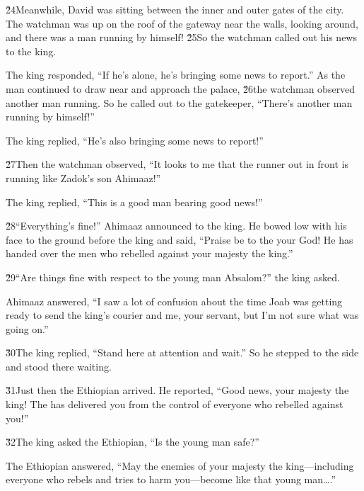 \v{24}Meanwhile, David was sitting between the inner and outer gates of the city. The watchman was up on the roof of the gateway near the walls, looking around, and there was a man running by himself! \v{25}So the watchman called out his news to the king.

The king responded, ``If he's alone, he's bringing some news to report.'' As the man continued to draw near and approach the palace, \v{26}the watchman observed another man running. So he called out to the gatekeeper, ``There's another man running by himself!''

The king replied, ``He's also bringing some news to report!''

\v{27}Then the watchman observed, ``It looks to me that the runner out in front is running like Zadok's son Ahimaaz!''

The king replied, ``This is a good man bearing good news!''

\v{28}``Everything's fine!'' Ahimaaz announced to the king. He bowed low with his face to the ground before the king and said, ``Praise be to the  your God! He has handed over the men who rebelled against your majesty the king.''

\v{29}``Are things fine with respect to the young man Absalom?'' the king asked.

Ahimaaz answered, ``I saw a lot of confusion about the time Joab was getting ready to send the king's courier and me, your servant, but I'm not sure what was going on.''

\v{30}The king replied, ``Stand here at attention and wait.'' So he stepped to the side and stood there waiting.

\v{31}Just then the Ethiopian arrived. He reported, ``Good news, your majesty the king! The  has delivered you from the control of everyone who rebelled against you!''

\v{32}The king asked the Ethiopian, ``Is the young man safe?''

The Ethiopian answered, ``May the enemies of your majesty the king---including everyone who rebels and tries to harm you---become like that young man{\ldots}.''

